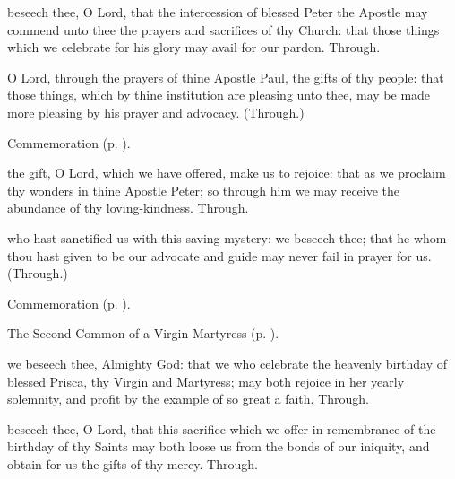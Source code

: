 \secret
{} beseech thee, O Lord, that the intercession of blessed Peter the Apostle may commend unto thee the prayers and sacrifices of thy Church: that those things which we celebrate for his glory may avail for our pardon. Through.

 O Lord, through the prayers of thine Apostle Paul, the gifts of thy people: that those things, which by thine institution are pleasing unto thee, may be made more pleasing by his prayer and advocacy. (Through.)

\begin{rubric}
    Commemoration  (p. \pageref{PriscaSecret}).
\end{rubric}


\postcommunion
{} the gift, O Lord, which we have offered, make us to rejoice: that as we proclaim thy wonders in thine Apostle Peter; so through him we may receive the abundance of thy loving-kindness. Through.

 who hast sanctified us with this saving mystery: we beseech thee; that he whom thou hast given to be our advocate and guide may never fail in prayer for us. (Through.)

\begin{rubric}
    Commemoration  (p. \pageref{PriscaPostcommunion}).
\end{rubric}


\clearpage
{}

\begin{rubric}
	The Second Common of a Virgin Martyress (p. \pageref{CommonVirginMartyrII}).
\end{rubric}

\collect\label{PriscaCollect}
 we beseech thee, Almighty God: that we who celebrate the heavenly birthday of blessed Prisca, thy Virgin and Martyress; may both rejoice in her yearly solemnity, and profit by the example of so great a faith. Through.

\secret\label{PriscaSecret}
 beseech thee, O Lord, that this sacrifice which we offer in remembrance of the birthday of thy Saints may both loose us from the bonds of our iniquity, and obtain for us the gifts of thy mercy. Through.

